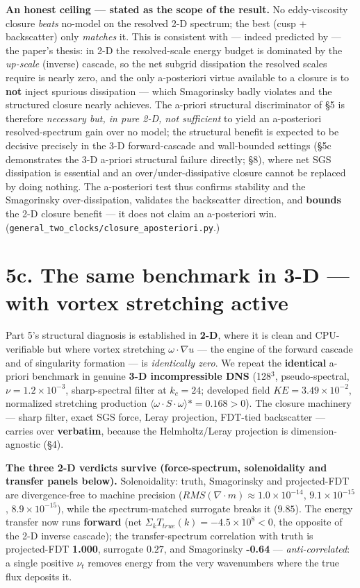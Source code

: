 \documentclass[aps,prfluids,preprint,superscriptaddress,nofootinbib]{revtex4-2}
\newcommand{\code}[1]{\texttt{#1}}
\begin{document}
\textbf{An honest ceiling — stated as the scope of the result.} No eddy-viscosity closure \emph{beats} no-model on the resolved 2-D spectrum; the best (cusp + backscatter) only \emph{matches} it. This is consistent with — indeed predicted by — the paper's thesis: in 2-D the resolved-scale energy budget is dominated by the \emph{up-scale} (inverse) cascade, so the net subgrid dissipation the resolved scales require is nearly zero, and the only a-posteriori virtue available to a closure is to \textbf{not} inject spurious dissipation — which Smagorinsky badly violates and the structured closure nearly achieves. The a-priori structural discriminator of §5 is therefore \emph{necessary but, in pure 2-D, not sufficient} to yield an a-posteriori resolved-spectrum gain over no model; the structural benefit is expected to be decisive precisely in the 3-D forward-cascade and wall-bounded settings (§5c demonstrates the 3-D a-priori structural failure directly; §8), where net SGS dissipation is essential and an over/under-dissipative closure cannot be replaced by doing nothing. The a-posteriori test thus confirms stability and the Smagorinsky over-dissipation, validates the backscatter direction, and \textbf{bounds} the 2-D closure benefit — it does not claim an a-posteriori win. (\code{general\_\allowbreak{}two\_\allowbreak{}clocks/\allowbreak{}closure\_\allowbreak{}aposteriori.\allowbreak{}py}.)

\section*{5c. The same benchmark in 3-D — with vortex stretching active}

Part 5's structural diagnosis is established in \textbf{2-D}, where it is clean and CPU-verifiable but where vortex stretching $\omega \cdot \nabla u$ — the engine of the forward cascade and of singularity formation — is \emph{identically zero}. We repeat the \textbf{identical} a-priori benchmark in genuine \textbf{3-D incompressible DNS} (128\ensuremath{^{3}}, pseudo-spectral, $\nu =1.2\times 10^{-3}$, sharp-spectral filter at $k_{c}=24$; developed field $KE=3.49\times 10^{-2}$, normalized stretching production $\langle \omega \cdot S\cdot \omega \rangle *=0.168>0$). The closure machinery — sharp filter, exact SGS force, Leray projection, FDT-tied backscatter — carries over \textbf{verbatim}, because the Helmholtz/Leray projection is dimension-agnostic (§4).

\textbf{The three 2-D verdicts survive (force-spectrum, solenoidality and transfer panels below).} Solenoidality: truth, Smagorinsky and projected-FDT are divergence-free to machine precision ($RMS(\nabla \cdot m) \approx  1.0\times 10^{-14}$, $9.1\times 10^{-15}$, $8.9\times 10^{-15}$), while the spectrum-matched surrogate breaks it ($9.85$). The energy transfer now runs \textbf{forward} (net $\Sigma _{k} T_{true}(k) = -4.5\times 10^{8} < 0$, the opposite of the 2-D inverse cascade); the transfer-spectrum correlation with truth is projected-FDT \textbf{1.000}, surrogate $0.27$, and Smagorinsky \textbf{-0.64} — \emph{anti-correlated}: a single positive $\nu _{t}$ removes energy from the very wavenumbers where the true flux deposits it.
\end{document}
